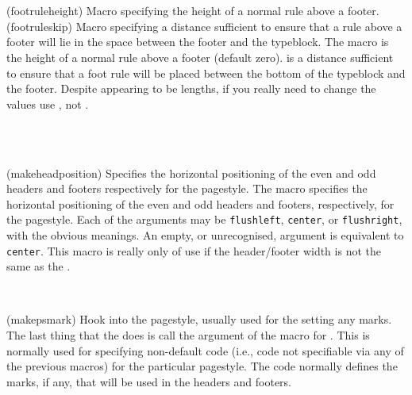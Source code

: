 \begin{syntax}
\cmd{\footruleheight} \\
\cmd{\footruleskip} \\
\end{syntax}
\glossary(footruleheight)%
  {}%
  {Macro specifying the height of a normal rule above a footer.}
\glossary(footruleskip)%
  {}%
  {Macro specifying a distance sufficient to ensure that a rule above a footer
   will lie in the space between the footer and the typeblock.}
The macro \cmd{\footruleheight} is the height of a normal
rule above a footer (default zero). 
\cmd{\footruleskip} is a distance 
sufficient to ensure that a foot rule will be placed between the bottom
of the typeblock and the footer. 
Despite appearing to be lengths, if you really need to change the values 
use \cmd{\renewcommand}, not \cmd{\setlength}.

\begin{syntax}
\cmd{\makeheadposition}\\
     \\
\end{syntax}
\glossary(makeheadposition)%
  {}%
  {Specifies the horizontal positioning of the even and odd headers and
   footers respectively for the  pagestyle.}
The \cmd{\makeheadposition} macro specifies the horizontal positioning
of the even and odd headers and footers, 
respectively, for the  pagestyle. 
Each of the  arguments may be \texttt{flushleft}, \texttt{center},
or \texttt{flushright}, with the obvious meanings. An empty, or unrecognised, 
argument is equivalent to \texttt{center}. This macro is really only of use 
if the header/footer width is not the 
same as the \lnc{\textwidth}.

\begin{syntax}
\cmd{\makepsmarks} \\
\end{syntax}
\glossary(makepsmark)
  {}%
  {Hook into the  pagestyle, usually used for the 
   setting any marks.}
The last thing that the \cmd{\pagestyle} does is call the
 argument of the \cmd{\makepsmarks} macro for .
This is normally used for specifying non-default code 
(i.e., code not specifiable via any of the previous macros) for the 
particular pagestyle. The code normally defines the marks, if any, 
that will be used in
the headers and footers.

